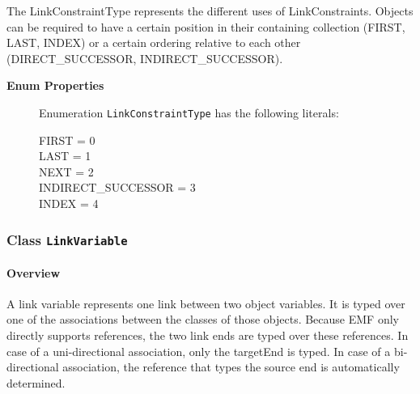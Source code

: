 			
The LinkConstraintType represents the different uses of LinkConstraints. Objects can be required to have a certain position in their containing collection (FIRST, LAST, INDEX) or a certain ordering relative to each other (DIRECT\_SUCCESSOR, INDIRECT\_SUCCESSOR).	
		
	


\begin{description}

	\item[\textbf{Enum Properties}] Enumeration \texttt{LinkConstraintType} has the following literals:

	\begin{description}
		
		\item[FIRST = 0]
		\hspace{\fill}
		\nopagebreak

		\item[LAST = 1]
		\hspace{\fill}
		\nopagebreak

		\item[NEXT = 2]
		\hspace{\fill}
		\nopagebreak

		\item[INDIRECT\_SUCCESSOR = 3]
		\hspace{\fill}
		\nopagebreak

		\item[INDEX = 4]
		\hspace{\fill}
		\nopagebreak
 
	\end{description}

\end{description}



\subsubsection{\Large{Class \bfseries \texttt{LinkVariable}\normalfont}}
\label{cls:storydiagrams::patterns::LinkVariable} 
\paragraph{Overview}

	
			
A link variable represents one link between two object variables. It is typed over one of the associations between the classes of those objects. Because EMF only directly supports references, the two link ends are typed over these references. In case of a uni-directional association, only the targetEnd is typed. In case of a bi-directional association, the reference that types the source end is automatically determined.	
		

